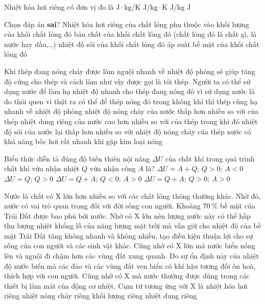 \begin{ex}
	Nhiệt hóa hơi riêng có đơn vị đo là	
	\choice
	{$\si{\joule\cdot\kilogram/\kelvin}$}
	{$\si{\joule/\kilogram\cdot\kelvin}$}
	{\True $\si{\joule/\kilogram}$}
	{$\si{\joule}$}
	\loigiai{}
\end{ex}
\begin{ex}
	Chọn đáp án \textbf{sai}? Nhiệt hóa hơi riêng của chất lỏng phụ thuộc vào
	\choice
	{\True khối lượng của khối chất lỏng đó}
	{bản chất của khối chất lỏng đó (chất lỏng đó là chất gì, là nước hay dầu,\dots)}
	{nhiệt độ sôi của khối chất lỏng đó}
	{áp suất bề mặt của khối chất lỏng đó}
	\loigiai{}
\end{ex}
\begin{ex}
	Khi thép đang nóng chảy được làm nguội nhanh về nhiệt độ phòng sẽ giúp tăng độ cứng cho thép và cách làm như vậy được gọi là tôi thép. Người ta có thể sử dụng nước để làm hạ nhiệt độ nhanh cho thép đang nóng đỏ vì
	\choice
	{sử dụng nước là do thói quen vì thật ra có thể để thép nóng đỏ trong không khí thì thép cũng hạ nhanh về nhiệt độ phòng}
	{nhiệt độ nóng chảy của nước thấp hơn nhiều so với của thép}
	{\True nhiệt dung riêng của nước cao hơn nhiều so với của thép trong khi đó nhiệt độ sôi của nước lại thấp hơn nhiều so với nhiệt độ nóng chảy của thép}
	{nước có khả năng bốc hơi rất nhanh khi gặp kim loại nóng}
	\loigiai{}
\end{ex}
\begin{ex}
	Biểu thức diễn tả đúng độ biến thiên nội năng $\Delta U$ của chất khí trong quá trình chất khí vừa nhận nhiệt $Q$ vừa nhận công $A$ là?
	\choice
	{$\Delta U=A+Q$; $Q>0$; $A<0$}
	{$\Delta U=Q$; $Q>0$}
	{$\Delta U=Q+A$; $Q<0 $; $A>0$}
	{\True $\Delta U=Q+A$; $Q>0 $; $A>0$}
	\loigiai{}
\end{ex}
\begin{ex}
	Nước là chất có X lớn hơn nhiều so với các chất lỏng thông thường khác. Nhờ đó, nước có vai trò quan trọng đối với đời sống con người. Khoảng $\SI{70}{\percent}$ bề mặt của Trái Đất được bao phủ bởi nước. Nhờ có X lớn nên lượng nước này có thể hấp thụ lượng nhiệt khổng lồ của năng lượng mặt trời mà vẫn giữ cho nhiệt độ của bề mặt Trái Đất tăng không nhanh và không nhiều, tạo điều kiện thuận lợi cho sự sống của con người và các sinh vật khác. Cũng nhờ có X lớn mà nước biển nóng lên và nguội đi chậm hơn các vùng đất xung quanh. Do sự ổn định này của nhiệt độ nước biển mà các đảo và các vùng đất ven biển có khí hậu tương đối ôn hoà, thích hợp với con người. Cũng nhờ có X mà nước thường được dùng trong các thiết bị làm mát của động cơ nhiệt. Cụm từ tương ứng với X là
	\choice
	{nhiệt hóa hơi riêng}
	{nhiệt nóng chảy riêng}
	{khối lượng riêng}
	{\True nhiệt dung riêng}
	\loigiai{}
\end{ex}
